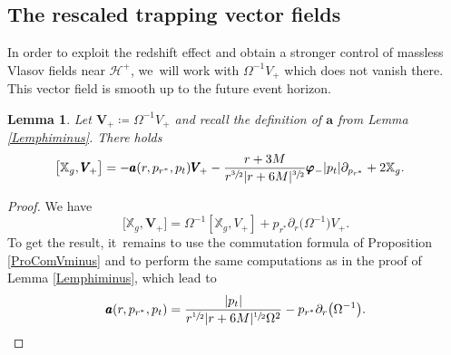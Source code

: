 \documentclass[JEP,XML,SOM,Unicode,published]{cedram}
\theoremstyle{plain}
\newtheorem{lemma}[proposition]{Lemma}
\theoremstyle{definition}
\newcommand\T{{\mathbb{X}}}
\renewcommand\H{{\mathcal{H}^+}}
\begin{document}
\subsection{The rescaled trapping vector fields}

In order to exploit the redshift effect and obtain a stronger control of massless Vlasov fields near $\H$, we~will work with $\Omega^{-1}V_+$ which does not vanish there. This vector field is smooth up to the future event horizon.

\begin{lemma}\label{LemComVminusregularised}
Let $\pmb{V}_{\! +}\coloneqq\Omega^{-1}V_+$ and recall the definition of $\pmb{a}$ from Lemma \ref{Lemphiminus}. There holds
\begin{align*}
\bigl[\T_g,\pmb{V}_{\! +}\bigr] &= - \pmb{a}(r,p_{r^*},p_t) \pmb{V}_{\! +}- \frac{r+3M}{r^{\sfrac{3}{2}}|r+6M|^{\sfrac{3}{2}}}\pmb{\varphi}_- |p_t|\partial_{p_{r^*}} + 2 \T_g.
\end{align*}
\end{lemma}
\begin{proof}
We have
\[
\bigl[\T_g,\pmb{V}_{\! +}\bigr]= \Omega^{-1}[\T_g,V_+]+p_{r^*} \partial_r \bigl(\Omega^{-1} \bigr) V_+.
\]
To get the result, it~remains to use the commutation formula of Proposition \ref{ProComVminus} and to perform the same computations as in the proof of Lemma \ref{Lemphiminus}, which lead to
\begin{equation}\label{eq:idbarbolda}
\pmb{a}(r,p_{r^*},p_t)= \frac{|p_t|}{r^{\sfrac{1}{2}}|r+6M|^{\sfrac{1}{2}}\Omega^2} -p_{r^*} \partial_r \bigl(\Omega^{-1} \bigr).\qedhere
\end{equation}
\end{proof}
\end{document}
